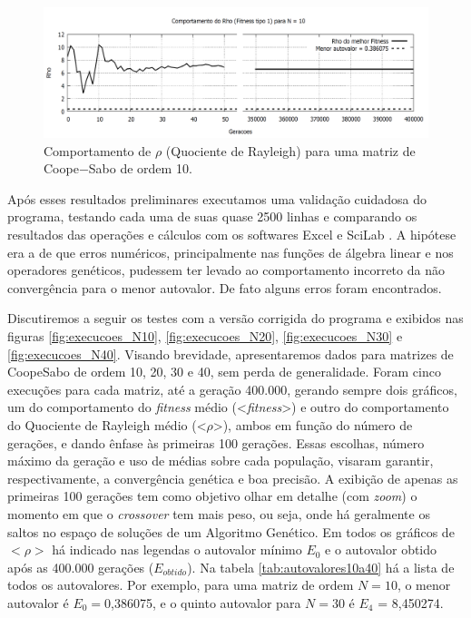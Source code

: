 	\newpage
	\begin{landscape}
	\begin{figure}[p]
		\centering
			\includegraphics[width=1.3\textwidth]{figs/resultados/rho_N10.png}
		\caption{Comportamento de $\rho$ (Quociente de Rayleigh) para uma matriz de Coope$-$Sabo de ordem 10.}
		\label{fig:rho_N10_completa}
	\end{figure}
	\end{landscape}
	\newpage
			
	Após esses resultados preliminares executamos uma validação cuidadosa do programa, testando cada uma de suas quase 2500 linhas e comparando os resultados das operações e cálculos com os softwares Excel \cite{excel} e SciLab \cite{scilab}. A hipótese era a de que erros numéricos, principalmente nas funções de álgebra linear e nos operadores genéticos, pudessem ter levado ao comportamento incorreto da não convergência para o menor autovalor. De fato alguns erros foram encontrados.
	
	Discutiremos a seguir os testes com a versão corrigida do programa e exibidos nas figuras \ref{fig:execucoes_N10}, \ref{fig:execucoes_N20}, \ref{fig:execucoes_N30} e \ref{fig:execucoes_N40}. Visando brevidade, apresentaremos dados para matrizes de Coope\-Sabo de ordem 10, 20, 30 e 40, sem perda de generalidade. Foram cinco execuções para cada matriz, até a geração 400.000, gerando sempre dois gráficos, um do comportamento do \textit{fitness} médio (<\textit{fitness}>) e outro do comportamento do Quociente de Rayleigh médio (<$\rho$>), ambos em função do número de gerações, e dando ênfase às primeiras 100 gerações. Essas escolhas, número máximo da geração e uso de médias sobre cada população, visaram garantir, respectivamente, a convergência genética e boa precisão. A exibição de apenas as primeiras 100 gerações tem como objetivo olhar em detalhe (com \textit{zoom}) o momento em que o \textit{crossover} tem mais peso, ou seja, onde há geralmente os saltos no espaço de soluções de um Algoritmo Genético. Em todos os gráficos de $<\rho>$ há indicado nas legendas o autovalor mínimo $E_0$ e o autovalor obtido após as 400.000 gerações ($E_{obtido}$). Na tabela \ref{tab:autovalores10a40} há a lista de todos os autovalores. Por exemplo, para uma matriz de ordem $N = 10$, o menor autovalor é $E_0 = $0,386075, e o quinto autovalor para $N = 30$ é $E_4$ = 8,450274.
	

